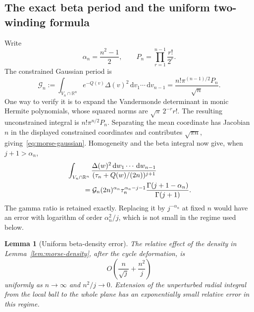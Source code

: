 \documentclass[11pt]{article}
\numberwithin{equation}{section}
\newtheorem{lemma}[theorem]{Lemma}
\theoremstyle{definition}
\newcommand{\R}{\mathbb R}
\newcommand{\dd}{\,\mathrm d}
\begin{document}
\subsection{The exact beta period and the uniform two-winding formula}

Write
\begin{equation}
 \alpha_n=\frac{n^2-1}{2},\qquad
 P_n=\prod_{r=1}^{n-1}\frac{r!}{2^r}.
 \label{eq:morse-alpha-P}
\end{equation}
The constrained Gaussian period is
\begin{equation}
 \mathcal G_n:=\int_{V_n\cap\R^n}e^{-Q(v)}\Delta(v)^2
                   \dd v_1\cdots\dd v_{n-1}
 =\frac{n!\pi^{(n-1)/2}P_n}{\sqrt n}.
 \label{eq:morse-gaussian}
\end{equation}
One way to verify it is to expand the Vandermonde determinant in monic
Hermite polynomials, whose squared norms are
$\sqrt\pi\,2^{-r}r!$.  The resulting unconstrained integral is
$n!\pi^{n/2}P_n$.  Separating the mean coordinate has Jacobian $n$
in the displayed constrained coordinates and contributes
$\sqrt{\pi n}$, giving~\eqref{eq:morse-gaussian}.
Homogeneity and the beta integral now give, when $j+1>\alpha_n$,
\begin{align}
 &\int_{V_n\cap\R^n}
 \frac{\Delta(w)^2\dd w_1\cdots\dd w_{n-1}}
 {(\tau_n+Q(w)/(2n))^{j+1}}\notag\\
 &\hspace{8mm}=
 \mathcal G_n(2n)^{\alpha_n}\tau_n^{\alpha_n-j-1}
 \frac{\Gamma(j+1-\alpha_n)}{\Gamma(j+1)}.
 \label{eq:morse-beta-period}
\end{align}
The gamma ratio is retained exactly.  Replacing it by
$j^{-\alpha_n}$ at fixed $n$ would have an error with logarithm of
order $\alpha_n^2/j$, which is not small in the regime used below.

\begin{lemma}[Uniform beta-density error]
\label{lem:negative-beta-uniform}
The relative effect of the density in
Lemma~\ref{lem:morse-density}, after the cycle deformation, is
\begin{equation}
 O\left(\frac n{\sqrt j}+\frac{n^2}{j}\right)
 \label{eq:morse-beta-relative-error}
\end{equation}
uniformly as $n\to\infty$ and $n^2/j\to0$.  Extension of the
unperturbed radial integral from the local ball to the whole plane
has an exponentially small relative error in this regime.
\end{lemma}
\end{document}
